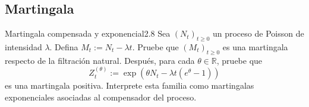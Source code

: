 \documentclass[10pt,a4paper]{article}
\begin{document}
\newpage

\subsection{Martingala}

\begin{ejercicio}{Martingala compensada y exponencial}{2.8}
    Sea $(N_t)_{t\ge 0}$ un proceso de Poisson de intensidad $\lambda$. Defina $M_t := N_t - \lambda t$.
    Pruebe que $(M_t)_{t\ge 0}$ es una martingala respecto de la filtración natural. Después, para cada $\theta \in \mathbb{R}$, pruebe que
    \[ Z_t^{(\theta)} := \exp\left( \theta N_t - \lambda t(e^\theta - 1) \right) \]
    es una martingala positiva. Interprete esta familia como martingalas exponenciales asociadas al compensador del proceso.
\end{ejercicio}
\end{document}
